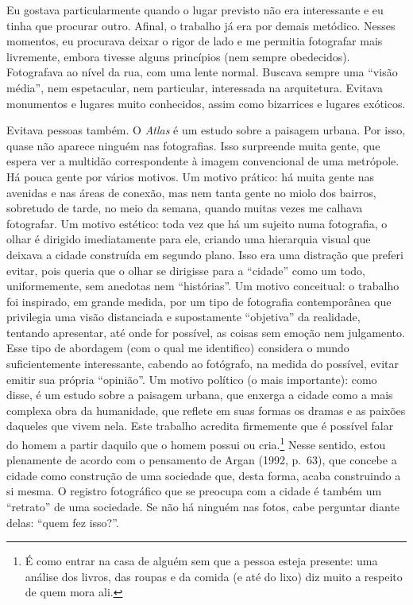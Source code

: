 Eu gostava particularmente quando o lugar previsto não era interessante
e eu tinha que procurar outro. Afinal, o trabalho já era por demais
metódico. Nesses momentos, eu procurava deixar o rigor de lado e me
permitia fotografar mais livremente, embora tivesse alguns princípios
(nem sempre obedecidos). Fotografava ao nível da rua, com uma lente
normal. Buscava sempre uma ``visão média'', nem espetacular, nem
particular, interessada na arquitetura. Evitava monumentos e lugares
muito conhecidos, assim como bizarrices e lugares exóticos.

Evitava pessoas também. O \emph{Atlas} é um estudo sobre a paisagem
urbana. Por isso, quase não aparece ninguém nas fotografias. Isso
surpreende muita gente, que espera ver a multidão correspondente à
imagem convencional de uma metrópole. Há pouca gente por vários motivos.
Um motivo prático: há muita gente nas avenidas e nas áreas de conexão,
mas nem tanta gente no miolo dos bairros, sobretudo de tarde, no meio da
semana, quando muitas vezes me calhava fotografar. Um motivo estético:
toda vez que há um sujeito numa fotografia, o olhar é dirigido
imediatamente para ele, criando uma hierarquia visual que deixava a
cidade construída em segundo plano. Isso era uma distração que preferi
evitar, pois queria que o olhar se dirigisse para a ``cidade'' como um
todo, uniformemente, sem anedotas nem ``histórias''. Um motivo
conceitual: o trabalho foi inspirado, em grande medida, por um tipo de
fotografia contemporânea que privilegia uma visão distanciada e
supostamente ``objetiva'' da realidade, tentando apresentar, até onde
for possível, as coisas sem emoção nem julgamento. Esse tipo de
abordagem (com o qual me identifico) considera o mundo suficientemente
interessante, cabendo ao fotógrafo, na medida do possível, evitar emitir
sua própria ``opinião''. Um motivo político (o mais importante): como
disse, é um estudo sobre a paisagem urbana, que enxerga a cidade como a
mais complexa obra da humanidade, que reflete em suas formas os dramas e
as paixões daqueles que vivem nela. Este trabalho acredita firmemente
que é possível falar do homem a partir daquilo que o homem possui ou
cria.\footnote{É como entrar na casa de alguém sem que a pessoa esteja
  presente: uma análise dos livros, das roupas e da comida (e até do
  lixo) diz muito a respeito de quem mora ali.} Nesse sentido, estou
plenamente de acordo com o pensamento de Argan (1992, p.~63), que
concebe a cidade como construção de uma sociedade que, desta forma,
acaba construindo a si mesma. O registro fotográfico que se preocupa com
a cidade é também um ``retrato'' de uma sociedade. Se não há ninguém nas
fotos, cabe perguntar diante delas: ``quem fez isso?''.

